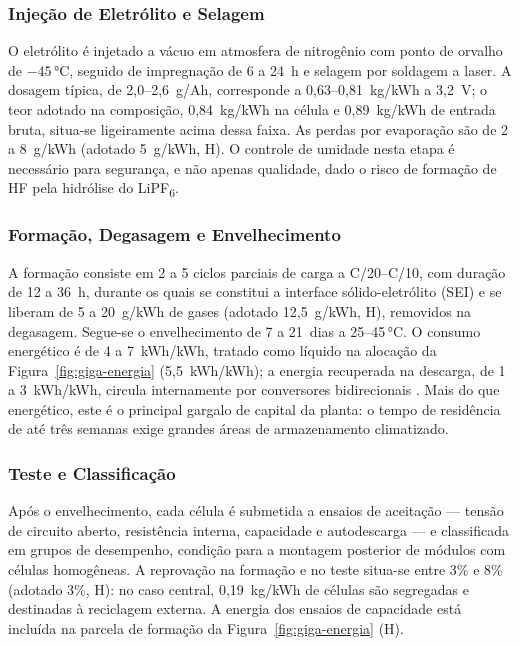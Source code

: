 \subsubsection{Injeção de Eletrólito e Selagem}

O eletrólito é injetado a vácuo em atmosfera de nitrogênio com ponto de orvalho
de $-45$\,°C, seguido de impregnação de 6 a 24~h e selagem por soldagem a laser.
A dosagem típica, de 2,0--2,6~g/Ah, corresponde a 0,63--0,81~kg/kWh a 3,2~V;
o teor adotado na composição, 0,84~kg/kWh na célula e 0,89~kg/kWh de entrada
bruta, situa-se ligeiramente acima dessa faixa. As perdas por evaporação são de 2
a 8~g/kWh (adotado 5~g/kWh, H). O controle de umidade nesta etapa é necessário
para segurança, e não apenas qualidade, dado o risco de formação de HF pela
hidrólise do LiPF\textsubscript{6}.

\subsubsection{Formação, Degasagem e Envelhecimento}

A formação consiste em 2 a 5 ciclos parciais de carga a C/20--C/10, com duração
de 12 a 36~h, durante os quais se constitui a interface sólido-eletrólito (SEI) e
se liberam de 5 a 20~g/kWh de gases (adotado 12,5~g/kWh, H), removidos na
degasagem. Segue-se o envelhecimento de 7 a 21~dias a 25--45\,°C. O consumo
energético é de 4 a 7~kWh/kWh, tratado como líquido na alocação da
Figura~\ref{fig:giga-energia} (5,5~kWh/kWh); a energia recuperada na descarga, de
1 a 3~kWh/kWh, circula internamente por conversores bidirecionais
. Mais do
que energético, este é o principal gargalo de capital da planta: o tempo de
residência de até três semanas exige grandes áreas de armazenamento climatizado.

\subsubsection{Teste e Classificação}

Após o envelhecimento, cada célula é submetida a ensaios de aceitação — tensão de
circuito aberto, resistência interna, capacidade e autodescarga — e classificada
em grupos de desempenho, condição para a montagem posterior de módulos com
células homogêneas. A reprovação na formação e no teste situa-se entre 3\% e 8\%
(adotado 3\%, H): no caso central, 0,19~kg/kWh de células são segregadas e
destinadas à reciclagem externa. A energia dos ensaios de capacidade está incluída
na parcela de formação da Figura~\ref{fig:giga-energia} (H).

